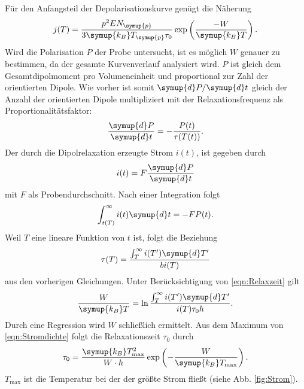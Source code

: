 \FloatBarrier
Für den Anfangsteil der Depolarisationskurve genügt die Näherung
\begin{equation}
    j(T)=\frac{p^2 E N_{\symup{p}}}{3 \symup{k_B} T_{\symup{p}}\tau_0}\exp\left(\frac{-W}{\symup{k_B}T}\right).    
\end{equation}
Wird die Polarisation $P$ der Probe untersucht, ist es möglich $W$ genauer zu bestimmen, da der gesamte Kurvenverlauf analysiert wird.
$P$ ist gleich dem Gesamtdipolmoment pro Volumeneinheit und proportional zur Zahl der orientierten Dipole.
Wie vorher ist somit $\symup{d}P/\symup{d}t$ gleich der Anzahl der orientierten Dipole multipliziert mit der Relaxationsfrequenz als Proportionalitätsfaktor:
\begin{equation*}
    \frac{\symup{d}P}{\symup{d}t}=-\frac{P(t)}{\tau(T(t))}.
\end{equation*}
Der durch die Dipolrelaxation erzeugte Strom $i(t)$, ist gegeben durch
\begin{equation*}
    i(t)=F\frac{\symup{d}P}{\symup{d}t}
\end{equation*}
mit $F$ als Probendurchschnitt.
Nach einer Integration folgt
\begin{equation*}
    \int_{t(T)}^{\infty} i(t)\symup{d}t=-F P(t).
\end{equation*}
Weil $T$ eine lineare Funktion von $t$ ist, folgt die Beziehung
\begin{equation*}
\tau(T)=\frac{\int_{T}^{\infty }i(T')\symup{d}T'}{b i(T)}
\end{equation*}
aus den vorherigen Gleichungen.
Unter Berücksichtigung von \eqref{eqn:Relaxzeit} gilt
\begin{equation}
    \frac{W}{\symup{k_B}T}=\ln\frac{\int_T^\infty i(T')\symup{d}T'}{i(T)\tau_0 h}.
\end{equation}
Durch eine Regression wird $W$ schließlich ermittelt.
Aus dem Maximum von \eqref{eqn:Stromdichte} folgt die Relaxationszeit $\tau_0$ durch
\begin{equation}
    \label{eqn:tau0}
    \tau_0 = \frac{\symup{k_B}T_\text{max}^2}{W \cdot h} \exp\left(-\frac{W}{\symup{k_B}T_\text{max}} \right).
\end{equation}
$T_\text{max}$ ist die Temperatur bei der der größte Strom fließt (siehe Abb. \ref{fig:Strom}). 


\FloatBarrier